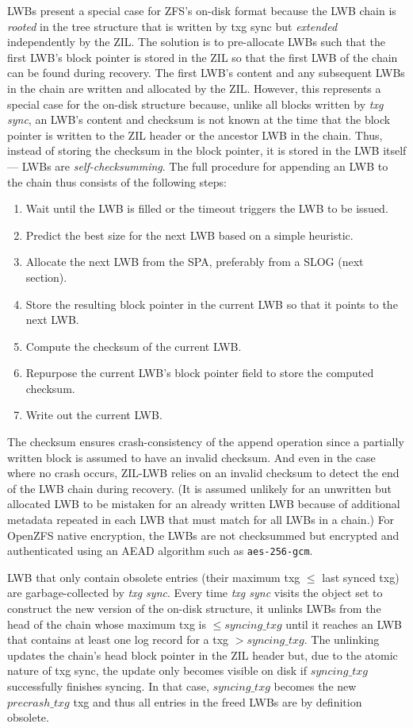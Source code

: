 \documentclass[12pt,a4paper,twoside]{book}
\begin{document}
LWBs present a special case for ZFS's on-disk format because the LWB chain is \textit{rooted} in the tree structure that is written by txg sync but \textit{extended} independently by the ZIL.
The solution is to pre-allocate LWBs such that the first LWB's block pointer is stored in the ZIL so that the first LWB of the chain can be found during recovery.
The first LWB's content and any subsequent LWBs in the chain are written and allocated by the ZIL.
However, this represents a special case for the on-disk structure because, unlike all blocks written by \textit{txg sync}, an LWB's content and checksum is not known at the time that the block pointer is written to the ZIL header or the ancestor LWB in the chain.
Thus, instead of storing the checksum in the block pointer, it is stored in the LWB itself --- LWBs are \textit{self-checksumming}.
The full procedure for appending an LWB to the chain thus consists of the following steps:
\begin{enumerate}[noitemsep]
    \item Wait until the LWB is filled or the timeout triggers the LWB to be issued.
    \item Predict the best size for the next LWB based on a simple heuristic.
    \item Allocate the next LWB from the SPA, preferably from a SLOG (next section).
    \item Store the resulting block pointer in the current LWB so that it points to the next LWB.
    \item Compute the checksum of the current LWB.
    \item Repurpose the current LWB's block pointer field to store the computed checksum.
    \item Write out the current LWB.
\end{enumerate}
The checksum ensures crash-consistency of the append operation since a partially written block is assumed to have an invalid checksum.
And even in the case where no crash occurs, ZIL-LWB relies on an invalid checksum to detect the end of the LWB chain during recovery.
(It is assumed unlikely for an unwritten but allocated LWB to be mistaken for an already written LWB because of additional metadata repeated in each LWB that must match for all LWBs in a chain.)
For OpenZFS native encryption, the LWBs are not checksummed but encrypted and authenticated using an AEAD algorithm such as \lstinline{aes-256-gcm}.

LWB that only contain obsolete entries (their maximum txg $\le$ last synced txg) are garbage-collected by \textit{txg sync}.
Every time \textit{txg sync} visits the object set to construct the new version of the on-disk structure, it unlinks LWBs from the head of the chain whose maximum txg is $\le syncing\_txg$ until it reaches an LWB that contains at least one log record for a txg $> syncing\_txg$.
The unlinking updates the chain's head block pointer in the ZIL header but, due to the atomic nature of txg sync, the update only becomes visible on disk if $syncing\_txg$ successfully finishes syncing.
In that case, $syncing\_txg$ becomes the new $precrash\_txg$ txg and thus all entries in the freed LWBs are by definition obsolete.
\end{document}
